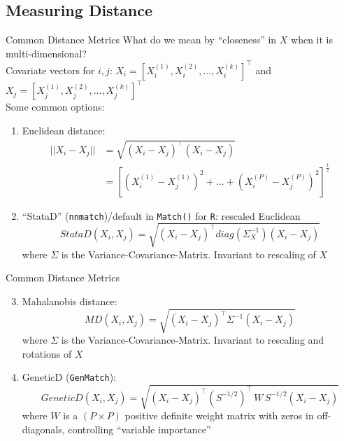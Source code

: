 \documentclass[xcolor=dvipsnames]{beamer}
\begin{document}
\subsection{Measuring Distance}
\begin{frame}{Common Distance Metrics}
\footnotesize
{} What do we mean by ``closeness'' in $X$ when it is multi-dimensional? \\
\medskip
Covariate vectors for $i,j$: $X_i=[X_i^{(1)},X_i^{(2)},...,X_i^{(k)}]^{\top}$ and 
$X_j=[X_j^{(1)},X_j^{(2)},...,X_j^{(k)}]^{\top}$ \\
\bigskip
{} Some common options:
\begin{enumerate}
\item<2-> Euclidean distance:
\begin{align*}
||X_i-X_j|| &= \sqrt {(X_i-X_j)^{\top}(X_i-X_j)} \\
&= [(X_i^{(1)}-X_j^{(1)})^2+...+(X_i^{(P)}-X_j^{(P)})^2 ]^{\frac{1}{2}}
\end{align*}

\item<3-> ``StataD'' (\texttt{nnmatch})/default in \texttt{Match()} for \texttt{R}: rescaled Euclidean
\[
StataD(X_i,X_j)=\sqrt{(X_i-X_j)^{\top}diag(\Sigma_X^{-1})(X_i-X_j)}
\]
where $\Sigma$ is the Variance-Covariance-Matrix. Invariant to rescaling of $X$\\
\end{enumerate}

\end{frame}

\begin{frame}{Common Distance Metrics}
\small
\begin{enumerate}
  \setcounter{enumi}{2}
\item<1-> Mahalanobis distance: 
\[
MD(X_i,X_j)=\sqrt{(X_i-X_j)^{\top}\Sigma^{-1}(X_i-X_j)}
\] where $\Sigma$ is the Variance-Covariance-Matrix. Invariant to rescaling and rotations of $X$\\
\bigskip
\item<2-> GeneticD (\texttt{GenMatch}):
\[
GeneticD(X_i,X_j) = \sqrt{(X_i - X_j)^{\top}(S^{-1/2})^{\top}\, W\, S^{-1/2} (X_i - X_j)}
\] where $W$ is a $(P \times P)$ positive definite weight matrix with zeros in off-diagonals, controlling ``variable  importance''
\end{enumerate}

\end{frame}
\end{document}
